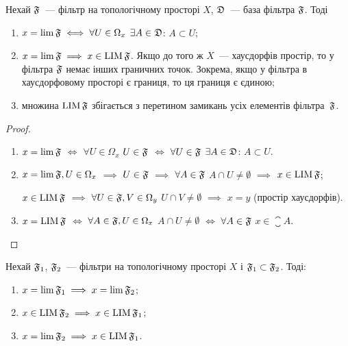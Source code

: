 \begin{theorem}
    \label{th:filterbase-limits-limitpoitns}
    Нехай $\frak F$~--- фільтр на топологічному просторі $X$, $\frak D$~--- %
    база фільтра $\frak F$. Тоді
    \begin{enumerate}
        \item $x = \lim \frak F \iff \forall U \in \Omega_x$ $\exists A \in \frak D$: $A \subset U$;
        
        \item $x = \lim \frak F \implies x \in \LIM \frak F$. Якщо до того ж $X$~--- хаусдорфів простір, то у фільтра $\frak F$ немає інших граничних точок. Зокрема, якщо у фільтра в хаусдорфовому просторі є границя, то ця границя є єдиною;
        
        \item множина $\LIM \frak F$ збігається з перетином замикань усіх елементів фільтра~$\frak F$.
    \end{enumerate}
\end{theorem}

\begin{proof}
    \listhack
    \begin{enumerate}
        \item $x = \lim \frak F$ $\iff$ $\forall U \in \Omega_x$ $U \in \frak F$ $\iff$ $\forall U \in \frak F$ $\exists A \in \frak D$: $A \subset U$.

        \item $x = \lim \frak F, U \in \Omega_x$ $\implies$ $U \in \frak F$ $\implies$ $\forall A \in \frak F$ $A \cap U \ne \emptyset$ $\implies$ $x \in \LIM \frak F$;
        
        $x \in \LIM \frak F$ $\implies$ $\forall U \in \frak F, V \in \Omega_y$ $U \cap V \ne \emptyset$ $\implies$ $x = y$ (простір хаусдорфів).

        \item $x = \LIM \frak F$ $\iff$ $\forall A \in \frak F, U \in \Omega_x$ $A \cap U \ne \emptyset$ $\iff$ $\forall A \in \frak F$ $x \in \closure A$. \qedhere
    \end{enumerate}
\end{proof}

\begin{theorem}
    \label{th:filters-limits-limitpoitns}
    Нехай $\frak F_1$, $\frak F_2$~--- фільтри на топологічному просторі $X$ і $\frak F_1 \subset \frak F_2$. Тоді:
    \begin{enumerate}
        \item $x = \lim \frak F_1 \implies x = \lim \frak F_2$;
        \item $x \in \LIM \frak F_2 \implies x \in \LIM \frak F_1$;
        \item $x = \lim \frak F_2 \implies x \in \LIM \frak F_1$.
    \end{enumerate}
\end{theorem}

